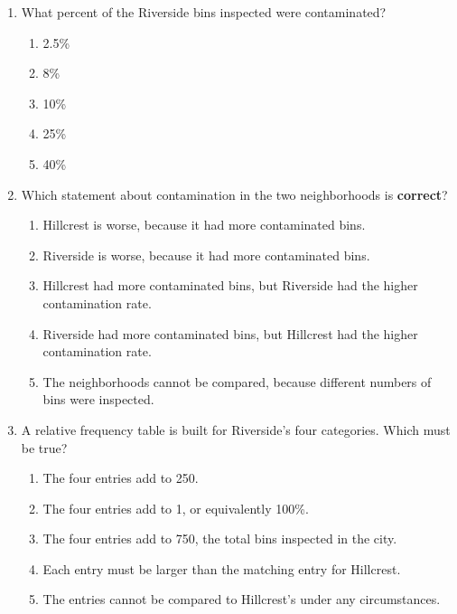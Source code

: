 \documentclass[12pt]{article}
\begin{document}
\begin{enumerate}[leftmargin=1.9em, itemsep=0.13in]

  \item What percent of the Riverside bins inspected were contaminated?
        \begin{enumerate}[label=\textbf{(\Alph*)}, leftmargin=2.2em, itemsep=2pt]
          \item 2.5\%
          \item 8\%
          \item 10\%
          \item 25\%
          \item 40\%
                \hfill{}
        \end{enumerate}

  \item Which statement about contamination in the two neighborhoods is \textbf{correct}?
        \begin{enumerate}[label=\textbf{(\Alph*)}, leftmargin=2.2em, itemsep=2pt]
          \item Hillcrest is worse, because it had more contaminated bins.
          \item Riverside is worse, because it had more contaminated bins.
          \item Hillcrest had more contaminated bins, but Riverside had the higher
                contamination rate.
          \item Riverside had more contaminated bins, but Hillcrest had the higher
                contamination rate.
          \item The neighborhoods cannot be compared, because different numbers of bins
                were inspected.
                \par\rule{0pt}{0.25in}\hfill{}
        \end{enumerate}

  \boxguard[9]
  \item A relative frequency table is built for Riverside's four categories. Which must
        be true?
        \begin{enumerate}[label=\textbf{(\Alph*)}, leftmargin=2.2em, itemsep=2pt]
          \item The four entries add to 250.
          \item The four entries add to 1, or equivalently 100\%.
          \item The four entries add to 750, the total bins inspected in the city.
          \item Each entry must be larger than the matching entry for Hillcrest.
          \item The entries cannot be compared to Hillcrest's under any circumstances.
                \hfill{}
        \end{enumerate}


\end{enumerate}
\end{document}
